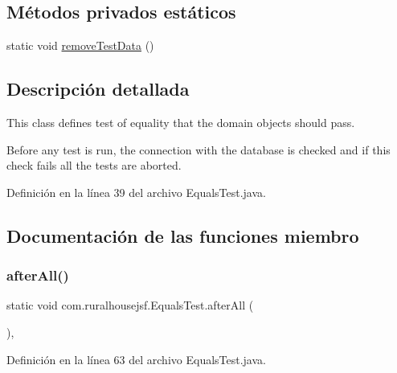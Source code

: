 \subsection*{Métodos privados estáticos}
\begin{DoxyCompactItemize}
\item 
static void \mbox{\hyperlink{classcom_1_1ruralhousejsf_1_1_equals_test_a74a69f394f6e76a2f557132edbc2ea00}{remove\+Test\+Data}} ()
\end{DoxyCompactItemize}


\subsection{Descripción detallada}
This class defines test of equality that the domain objects should pass. 

Before any test is run, the connection with the database is checked and if this check fails all the tests are aborted. 

Definición en la línea 39 del archivo Equals\+Test.\+java.



\subsection{Documentación de las funciones miembro}
\mbox{\label{classcom_1_1ruralhousejsf_1_1_equals_test_afea5be25670fd0d03ebb37e737bda19b}} 
\subsubsection{\texorpdfstring{afterAll()}{afterAll()}}
{\footnotesize\ttfamily static void com.\+ruralhousejsf.\+Equals\+Test.\+after\+All (\begin{DoxyParamCaption}{ }\end{DoxyParamCaption})\hspace{0.3cm}{\ttfamily [static]}, {\ttfamily [package]}}



Definición en la línea 63 del archivo Equals\+Test.\+java.

\mbox{\label{classcom_1_1ruralhousejsf_1_1_equals_test_a114c96cfa4dbde48a42802952f8cd5b0}} 
